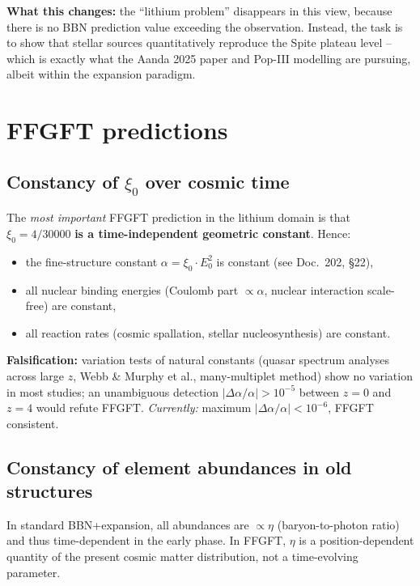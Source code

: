 \textbf{What this changes:} the \enquote{lithium problem} disappears
in this view, because there is no BBN prediction value exceeding the
observation. Instead, the task is to show that stellar sources
quantitatively reproduce the Spite plateau level -- which is exactly
what the Aanda 2025 paper and Pop-III modelling are pursuing, albeit
within the expansion paradigm.

\section{FFGFT predictions}

\subsection{\texorpdfstring{Constancy of $\xi_0$ over cosmic time}{Constancy of xi_0 over cosmic time}}

The \emph{most important} FFGFT prediction in the lithium domain is
that $\xi_0 = 4/30000$ \textbf{is a time-independent geometric
constant}. Hence:
\begin{itemize}[leftmargin=2em,itemsep=2pt,topsep=2pt]
  \item the fine-structure constant $\alpha = \xi_0 \cdot E_0^2$
        is constant (see Doc.~202, §22),
  \item all nuclear binding energies (Coulomb part $\propto \alpha$,
        nuclear interaction scale-free) are constant,
  \item all reaction rates (cosmic spallation, stellar
        nucleosynthesis) are constant.
\end{itemize}

\textbf{Falsification:} variation tests of natural constants
(quasar spectrum analyses across large $z$, Webb \& Murphy et al.,
many-multiplet method) show no variation in most studies; an
unambiguous detection $|\Delta\alpha/\alpha| > 10^{-5}$ between
$z = 0$ and $z = 4$ would refute FFGFT. \emph{Currently:} maximum
$|\Delta\alpha/\alpha| < 10^{-6}$, FFGFT consistent.

\subsection{Constancy of element abundances in old structures}

In standard BBN+expansion, all abundances are $\propto \eta$
(baryon-to-photon ratio) and thus time-dependent in the early phase.
In FFGFT, $\eta$ is a position-dependent quantity of the present
cosmic matter distribution, not a time-evolving parameter.

